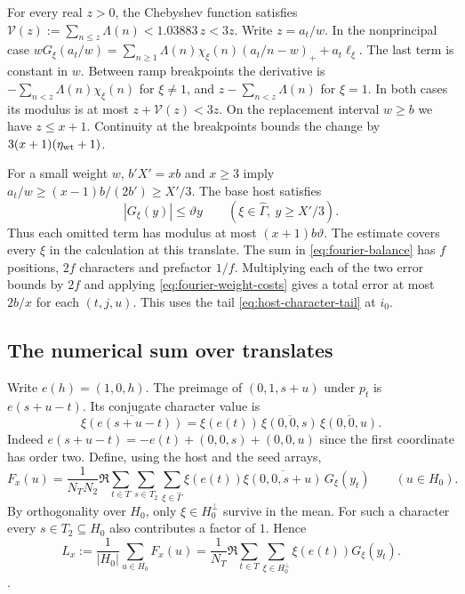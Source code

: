 For every real \(z>0\), the Chebyshev function satisfies
\(\mathcal V(z):=\sum_{n\le z}\Lambda(n)<1.03883\,z<3z\).
\cite[Theorem~12, (3.35)]{rosser-schoenfeld}
Write \(z=a_t/w\). In the nonprincipal case
\(wG_\xi(a_t/w)=\sum_{n\ge1}\Lambda(n)\chi_\xi(n)(a_t/n-w)_++a_t\ell_\xi\).
The last term is constant in \(w\). Between ramp breakpoints the
derivative is \(-\sum_{n<z}\Lambda(n)\chi_\xi(n)\) for \(\xi\ne1\), and
\(z-\sum_{n<z}\Lambda(n)\) for \(\xi=1\). In both cases its modulus is
at most \(z+\mathcal V(z)<3z\). On the replacement interval \(w\ge b\)
we have \(z\le x+1\). Continuity at the breakpoints bounds the change
by \(3(x+1)(\eta_{\rm wt}+1)\).

\leavevmode{}%
For a small weight \(w\), \(b'X'=xb\) and \(x\ge3\) imply
\(a_t/w\ge (x-1)b/(2b')\ge X'/3\). The base host satisfies
\[
 |G_\xi(y)|\le \vartheta y\qquad
 (\xi\in\widehat\Gamma,\ y\ge X'/3).
\]
Thus each omitted term has modulus at most \((x+1)b\vartheta\).
The estimate covers every \(\xi\) in the calculation at this translate.
The sum in
\eqref{eq:fourier-balance} has \(f\) positions, \(2f\) characters
and prefactor \(1/f\). Multiplying each of the two error bounds by
\(2f\) and applying \eqref{eq:fourier-weight-costs} gives a total
error at most \(2b/x\) for each \((t,j,u)\). This uses the tail
\eqref{eq:host-character-tail} at \(i_0\).

\subsection{The numerical sum over translates}

Write \(e(h)=(1,0,h)\). The preimage of \((0,1,s+u)\) under \(p_t\)
is \(e(s+u-t)\). Its conjugate character value is
\[
 \overline{\xi(e(s+u-t))}
   =\xi(e(t))\,\overline{\xi(0,0,s)}\,\overline{\xi(0,0,u)}.
\]
Indeed \(e(s+u-t)=-e(t)+(0,0,s)+(0,0,u)\) since the first coordinate
has order two.
Define, using the host and the seed arrays,
\begin{equation}
\label{eq:fourier-numerical-translate}
 F_x(u)=\frac1{N_TN_2}\Re\sum_{t\in T}\sum_{s\in T_2}
           \sum_{\xi\in\widehat\Gamma}
          \xi(e(t))\overline{\xi(0,0,s+u)}\,G_\xi(y_t)
       \qquad(u\in H_0).
\end{equation}
By orthogonality over \(H_0\), only \(\xi\in H_0^\perp\) survive in
the mean. For such a character every \(s\in T_2\subseteq H_0\) also
contributes a factor of \(1\). Hence
\begin{equation}
\label{eq:fourier-numerical-mean}
 L_x:=\frac1{|H_0|}\sum_{u\in H_0}F_x(u)
    =\frac1{N_T}\Re\sum_{t\in T}\sum_{\xi\in H_0^\perp}
                 \xi(e(t))G_\xi(y_t).
\end{equation}
.


